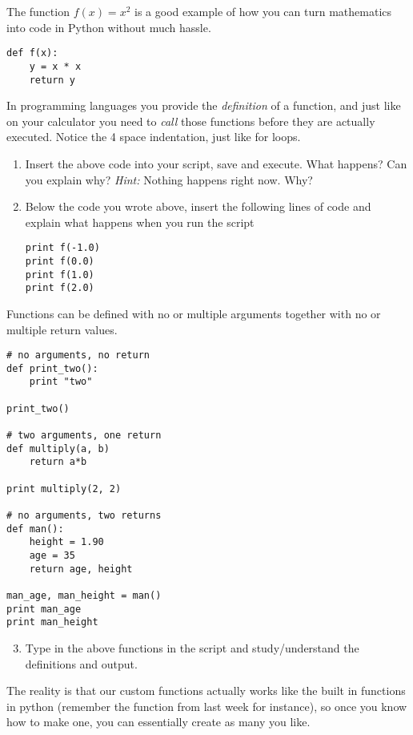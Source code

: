 \documentclass{article}
\begin{document}
The function $f(x)=x^2$ is a good example of how you can turn mathematics into code in Python without much hassle.

\begin{lstlisting}
def f(x):
    y = x * x
    return y
\end{lstlisting}

In programming languages you provide the {\em definition} of a function, and just like on your calculator you need to {\em call} those functions before they are actually executed.
Notice the 4 space indentation, just like for loops.

\begin{enumerate}
  \item Insert the above code into your script, save and execute. What
      happens? Can you explain why? {\em Hint:} Nothing happens right now. Why?
  \item Below the code you wrote above, insert the following lines of code and
    explain what happens when you run the script

\begin{lstlisting}
print f(-1.0)
print f(0.0)
print f(1.0)
print f(2.0)
\end{lstlisting}

\end{enumerate}

Functions can be defined with no or multiple arguments together with no or multiple return values.

\begin{lstlisting}
# no arguments, no return
def print_two():
    print "two"
    
print_two()

# two arguments, one return
def multiply(a, b)
    return a*b

print multiply(2, 2)

# no arguments, two returns
def man():
    height = 1.90
    age = 35
    return age, height

man_age, man_height = man()
print man_age
print man_height

\end{lstlisting}

\begin{enumerate}
    \setcounter{enumi}{2}
    \item Type in the above functions in the script and study/understand the definitions and output.
\end{enumerate}

The reality is that our custom functions actually works like the built in functions in python (remember the  function from last week for instance), so once you know how to make one, you can essentially create as many you like.\\
\end{document}
